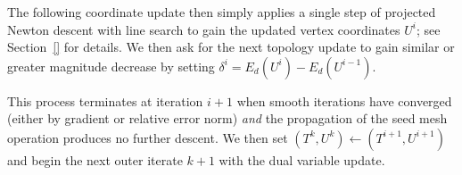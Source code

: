 The following coordinate update then simply applies a single step of projected Newton descent with line search to gain the updated vertex coordinates $U^i$; see Section~\ref{} for details. We then ask for the next topology update to gain similar or greater magnitude decrease by setting $\delta^i = E_d(U^i) - E_d(U^{i-1})$.

This process terminates at iteration $i+1$ when smooth iterations have converged (either by gradient or relative error norm) \emph{and} the propagation of the seed mesh operation produces no further descent. We then set $(T^k,U^k) \leftarrow (T^{i+1},U^{i+1})$ and begin the next outer iterate $k+1$ with the dual variable update. 


